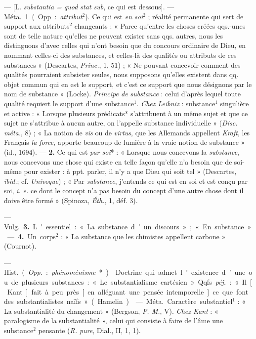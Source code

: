 \begin{itemize}[leftmargin=1cm, label=, itemsep=1pt]
 — [L. {\it substantia = quod stat sub}, ce qui est dessous].
— \si{Méta.} 1. (Opp. : {\it attribut}$^2$). Ce qui est {\it en soi}$^2$ ;
réalité permanente qui sert de support aux attributs$^2$ changeants : «
Parce qu’entre les choses créées qqs.-unes sont de telle nature qu’elles ne
peuvent exister sans qqs. autres, nous les distinguons d’avec celles qui
n’ont besoin que du concours ordinaire de Dieu, en nommant celles-ci des
substances, et celles-là des qualités ou attributs de ces substances
» (Descartes, {\it Princ.}, 1, 51) ; « Ne pouvant concevoir comment des
qualités pourraient subsister seules, nous supposons qu’elles existent dans
qq. objet commun qui en est le support, et c'est ce support que nous
désignons par le nom de substance » (Locke). {\it Principe de substance} :
celui d'après lequel toute qualité requiert le support d'une substance$^1$.
{\it Chez Leibniz} : substance$^1$ singulière et active : « Lorsque
plusieurs prédicats* s’attribuent à un même sujet et que ce sujet ne
s’attribue à aucun autre, on l’appelle substance individuelle » ({\it Disc.
méta.}, 8) ; « La notion de {\it vis} ou de {\it virtus}, que les Allemands
appellent {\it Kraft}, les Français {\it la force}, apporte beaucoup de
lumière à la vraie notion de substance » (id., 1694). — {\bf 2.} Ce qui est
{\it par soi}* : « Lorsque nous concevons la {\it substance}, nous concevons
une chose qui existe en telle façon qu’elle n’a besoin que de soi-même pour
exister : à ppt. parler, il n’y a que Dieu qui soit tel » (Descartes,
{\it ibid.}; cf. {\it Univoque}) ; « Par {\it substance}, j'entends ce qui
est en soi et est conçu par soi, {\it i. e.} ce dont le concept n'a pas
besoin du concept d’une autre chose dont il doive être formé » (Spinoza,
{\it Éth.}, 1, déf. 3).

— \si{Vulg.} {\bf 3.} L'essentiel : « La substance d’un discours » ; « En
substance ». — {\bf 4.} Un corps$^2$ : « La substance que les chimistes
appellent carbone » (Cournot).

 — \si{Hist.} ({\it Opp.} : {\it phénoménisme}*).
 Doctrine qui admet l’existence d’une ou de plusieurs
substances : « Le substantialisme cartésien ». Qqfs. {\it péj.} : « Il
[Kant] fait à peu près [en alléguant une pensée intemporelle] ce que font
des substantialistes naïfs » (Hamelin).

 — \si{Méta.} Caractère substantiel$^1$ : « La
substantialité du changement » (Bergson, {\it P. M.}, V). {\it Chez Kant} :
« paralogisme de la substantialité », celui qui consiste à faire de l'âme
une substance$^2$ pensante ({\it R. pure}, Dial., II, 1, 1).


\end{itemize}
